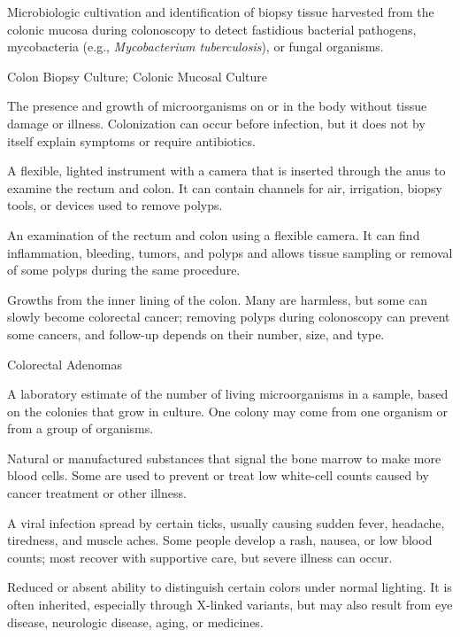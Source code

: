  Microbiologic cultivation and identification of biopsy tissue harvested from the colonic mucosa during colonoscopy to detect fastidious bacterial pathogens, mycobacteria (e.g., \textit{Mycobacterium tuberculosis}), or fungal organisms.

\synonyms
Colon Biopsy Culture; Colonic Mucosal Culture

 The presence and growth of microorganisms on or in the body without tissue damage or illness. Colonization can occur before infection, but it does not by itself explain symptoms or require antibiotics.

 A flexible, lighted instrument with a camera that is inserted through the anus to examine the rectum and colon. It can contain channels for air, irrigation, biopsy tools, or devices used to remove polyps.

 An examination of the rectum and colon using a flexible camera. It can find inflammation, bleeding, tumors, and polyps and allows tissue sampling or removal of some polyps during the same procedure.

 Growths from the inner lining of the colon. Many are harmless, but some can slowly become colorectal cancer; removing polyps during colonoscopy can prevent some cancers, and follow-up depends on their number, size, and type.

\synonyms
Colorectal Adenomas

 A laboratory estimate of the number of living microorganisms in a sample, based on the colonies that grow in culture. One colony may come from one organism or from a group of organisms.

 Natural or manufactured substances that signal the bone marrow to make more blood cells. Some are used to prevent or treat low white-cell counts caused by cancer treatment or other illness.

 A viral infection spread by certain ticks, usually causing sudden fever, headache, tiredness, and muscle aches. Some people develop a rash, nausea, or low blood counts; most recover with supportive care, but severe illness can occur.

 Reduced or absent ability to distinguish certain colors under normal lighting. It is often
inherited, especially through X-linked variants, but may also result from eye disease, neurologic disease, aging, or
medicines.

